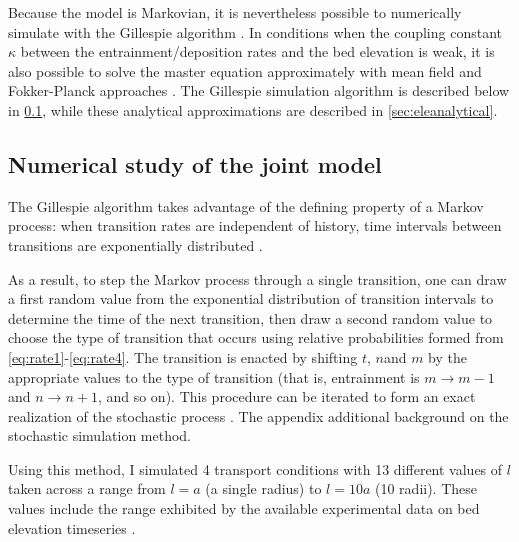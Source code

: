Because the model is Markovian, it is nevertheless possible to numerically simulate \DIFdelbegin {}\DIFdelend \DIFaddbegin {}\DIFaddend with the Gillespie algorithm \citep{Gillespie1977, Gillespie1991, Gillespie2007}. 
In conditions when the coupling constant $\kappa$ between the entrainment/deposition rates and the bed elevation is weak, it is also possible to solve the master equation approximately with mean field and Fokker-Planck approaches \citep{Haken1978,Gardiner1983}.
The Gillespie simulation algorithm is described below in \DIFaddbegin {}\DIFaddend \ref{sec:elenumerical}, while these analytical approximations are described in \DIFaddbegin {}\DIFaddend \ref{sec:eleanalytical}.

\subsection{Numerical study of the joint model}
\label{sec:elenumerical}

The Gillespie algorithm takes advantage of the defining property of a Markov process: when transition rates are independent of history, time intervals between transitions are
exponentially distributed \citep{Cox1965}.

As a result, to step the Markov process through a single transition, one can draw a first random value from the exponential distribution of transition intervals to determine the time of the next transition,
then draw a second random value to choose the type of transition that occurs using relative probabilities formed from \DIFdelbegin {}\DIFdelend \DIFaddbegin {}\DIFaddend \ref{eq:rate1}-\ref{eq:rate4}\DIFdelbegin \DIFdel{)}\DIFdelend . The transition is enacted by shifting $t$, $n$\DIFaddbegin \DIFadd{, }\DIFaddend and $m$ by the appropriate values to the type of transition (that is, entrainment is $m\rightarrow m-1$ and $n \rightarrow n+1$, and so on).
This procedure can be iterated to form an exact realization of the stochastic process \citep{Gillespie2007}.
The appendix \DIFdelbegin {}\DIFdelend \DIFaddbegin {}\DIFaddend additional background on the stochastic simulation method.

Using this method, I simulated 4 transport conditions with 13 different values of $l$ taken across a range from $l=a$ (a single radius) to $l=10a$ (10 radii).
These values include the range exhibited by the available experimental data on bed elevation timeseries \citep{Wong2007,Singh2009,Martin2014}.

